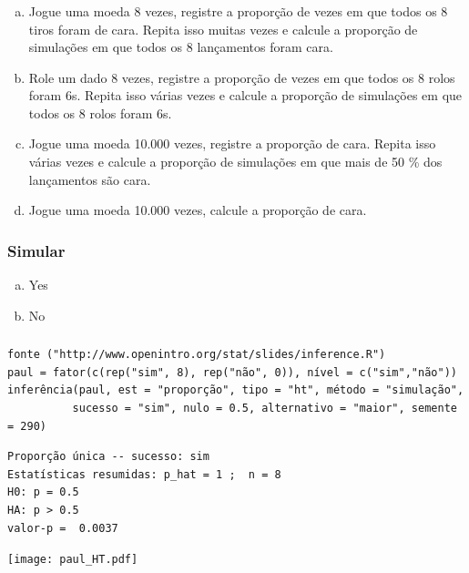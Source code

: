 \documentclass[11pt]{beamer}
\begin{document}

\begin{frame}
\frametitle{}


\begin{enumerate}[(a)]
\item Jogue uma moeda 8 vezes, registre a proporção de vezes em que todos os 8 tiros foram de cara. Repita isso muitas vezes e calcule a proporção de simulações em que todos os 8 lançamentos foram cara.
\item Role um dado 8 vezes, registre a proporção de vezes em que todos os 8 rolos foram 6s. Repita isso várias vezes e calcule a proporção de simulações em que todos os 8 rolos foram 6s.
\item Jogue uma moeda 10.000 vezes, registre a proporção de cara. Repita isso várias vezes e calcule a proporção de simulações em que mais de 50 \% dos lançamentos são cara.
\item Jogue uma moeda 10.000 vezes, calcule a proporção de cara.
\end{enumerate}

\end{frame}


\begin{frame}
\frametitle{Simular}


\begin{enumerate}[(a)]
\item Yes
\item No
\end{enumerate}

\end{frame}


\begin{frame}[fragile]
\frametitle{}

{\tiny
\begin{Verbatim}[frame=single, formatcom=\color{blue}]
fonte ("http://www.openintro.org/stat/slides/inference.R")
paul = fator(c(rep("sim", 8), rep("não", 0)), nível = c("sim","não"))
inferência(paul, est = "proporção", tipo = "ht", método = "simulação",
          sucesso = "sim", nulo = 0.5, alternativo = "maior", semente = 290)
\end{Verbatim}
}

\pause

{\tiny
\begin{Verbatim}[frame=single, formatcom=\color{gray}]
Proporção única -- sucesso: sim
Estatísticas resumidas: p_hat = 1 ;  n = 8 
H0: p = 0.5 
HA: p > 0.5 
valor-p =  0.0037
\end{Verbatim}
}

\centering
\texttt{[image: paul\_HT.pdf]}

\end{frame}
\end{document}
